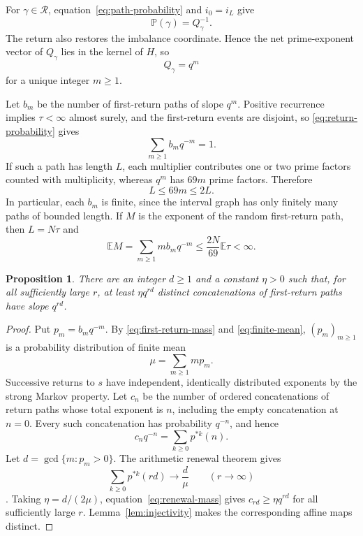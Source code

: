 \documentclass[11pt,a4paper]{amsart}
\newtheorem{proposition}[theorem]{Proposition}
\newcommand{\Pp}{\mathbb P}
\newcommand{\Ee}{\mathbb E}
\begin{document}
For $\gamma\in\mathcal R$, equation~\eqref{eq:path-probability} and $i_0=i_L$ give
\begin{equation}\label{eq:return-probability}
 \Pp(\gamma)=Q_\gamma^{-1}.
\end{equation}
The return also restores the imbalance coordinate. Hence the net prime-exponent vector of $Q_\gamma$ lies in the kernel of $H$, so
\[
 Q_\gamma=q^m
\]
for a unique integer $m\ge1$.

Let $b_m$ be the number of first-return paths of slope $q^m$. Positive recurrence implies $\tau<\infty$ almost surely, and the first-return events are disjoint, so \eqref{eq:return-probability} gives
\begin{equation}\label{eq:first-return-mass}
 \sum_{m\ge1}b_mq^{-m}=1.
\end{equation}
If such a path has length $L$, each multiplier contributes one or two prime factors counted with multiplicity, whereas $q^m$ has $69m$ prime factors. Therefore
\begin{equation}\label{eq:length-exponent}
 L\le69m\le2L.
\end{equation}
In particular, each $b_m$ is finite, since the interval graph has only finitely many paths of bounded length. If $M$ is the exponent of the random first-return path, then $L=N\tau$ and
\begin{equation}\label{eq:finite-mean}
 \Ee M=\sum_{m\ge1}m b_mq^{-m}
 \le\frac{2N}{69}\Ee\tau<\infty.
\end{equation}

\begin{proposition}\label{prop:renewal-count}
There are an integer $d\ge1$ and a constant $\eta>0$ such that, for all sufficiently large $r$, at least $\eta q^{rd}$ distinct concatenations of first-return paths have slope $q^{rd}$.
\end{proposition}

\begin{proof}
Put $p_m=b_mq^{-m}$. By \eqref{eq:first-return-mass} and \eqref{eq:finite-mean}, $(p_m)_{m\ge1}$ is a probability distribution of finite mean
\[
 \mu=\sum_{m\ge1}mp_m.
\]
Successive returns to $s$ have independent, identically distributed exponents by the strong Markov property. Let $c_n$ be the number of ordered concatenations of return paths whose total exponent is $n$, including the empty concatenation at $n=0$. Every such concatenation has probability $q^{-n}$, and hence
\begin{equation}\label{eq:renewal-mass}
 c_nq^{-n}=\sum_{k\ge0}p^{*k}(n).
\end{equation}
Let $d=\gcd\{m:p_m>0\}$. The arithmetic renewal theorem gives
\[
 \sum_{k\ge0}p^{*k}(rd)\longrightarrow\frac d\mu
 \qquad(r\to\infty)
\]
\cite[Chapter~XI, Section~1]{Feller}. Taking $\eta=d/(2\mu)$, equation~\eqref{eq:renewal-mass} gives $c_{rd}\ge\eta q^{rd}$ for all sufficiently large $r$. Lemma~\ref{lem:injectivity} makes the corresponding affine maps distinct.
\end{proof}
\end{document}
